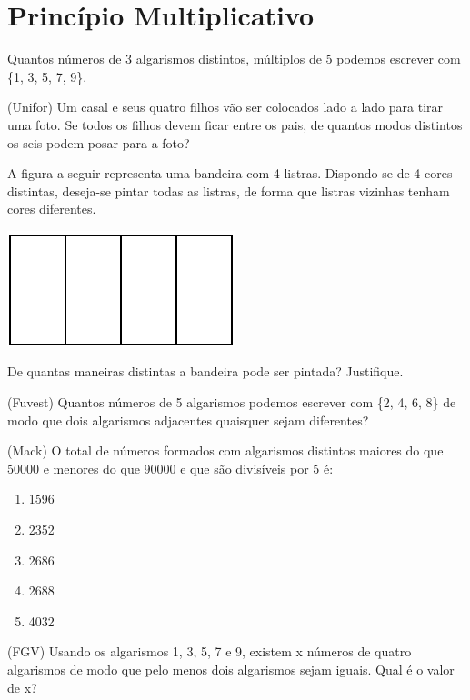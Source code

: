 		\section{Princípio Multiplicativo}
		
		\item Quantos números de 3 algarismos distintos, múltiplos de 5 podemos escrever com \{1, 3, 5, 7, 9\}.

		\item (Unifor) Um casal e seus quatro filhos vão ser colocados lado a lado para tirar uma foto. Se todos os filhos devem ficar entre os pais, de quantos modos distintos os seis podem posar para a foto?

		\item A figura a seguir representa uma bandeira com 4 listras. Dispondo-se de 4 cores distintas, deseja-se pintar todas as listras, de forma que listras vizinhas tenham cores diferentes.
		\begin{center}
		\includegraphics[scale=0.5]{figuras/fig23.png}
		\end{center}
		De quantas maneiras distintas a bandeira pode ser pintada? Justifique.		

		\item (Fuvest) Quantos números de 5 algarismos podemos escrever com \{2, 4, 6, 8\} de modo que dois algarismos adjacentes quaisquer sejam diferentes?		

		\item (Mack) O total de números formados com algarismos distintos maiores do que 50000 e menores do que 90000 e que são divisíveis por 5 é:
		\begin{multicols}{5}		
		\begin{enumerate}
			\item 1596
			\item 2352
			\item 2686
			\item 2688
			\item 4032
		\end{enumerate}
		\end{multicols}

		\item (FGV) Usando os algarismos 1, 3, 5, 7 e 9, existem x números de quatro algarismos de modo que pelo menos dois algarismos sejam iguais. Qual é o valor de x?

